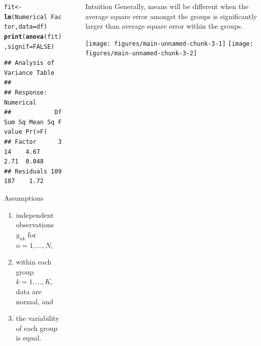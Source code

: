 \documentclass[final,9pt,fleqn]{beamer}\usepackage[]{graphicx}\usepackage[]{color}
\makeatletter
\newcommand{\hlnum}[1]{\textcolor[rgb]{0.686,0.059,0.569}{#1}}%
\newcommand{\hlopt}[1]{\textcolor[rgb]{0,0,0}{#1}}%
\newcommand{\hlstd}[1]{\textcolor[rgb]{0.345,0.345,0.345}{#1}}%
\newcommand{\hlkwb}[1]{\textcolor[rgb]{0.69,0.353,0.396}{#1}}%
\newcommand{\hlkwc}[1]{\textcolor[rgb]{0.333,0.667,0.333}{#1}}%
\newcommand{\hlkwd}[1]{\textcolor[rgb]{0.737,0.353,0.396}{\textbf{#1}}}%
\newenvironment{kframe}{%
 \def\at@end@of@kframe{}%
 \ifinner\ifhmode%
  \def\at@end@of@kframe{\end{minipage}}%
  \begin{minipage}{\columnwidth}%
 \fi\fi%
 \def\FrameCommand##1{\hskip\@totalleftmargin \hskip-\fboxsep
 \colorbox{shadecolor}{##1}\hskip-\fboxsep
     \hskip-\linewidth \hskip-\@totalleftmargin \hskip\columnwidth}%
 \MakeFramed {\advance\hsize-\width
   \@totalleftmargin\z@ \linewidth\hsize
   \@setminipage}}%
 {\par\unskip\endMakeFramed%
 \at@end@of@kframe}
\newenvironment{knitrout}{}{} %
\makeatother
\begin{document}
\begin{frame}[fragile]
\begin{columns}
\begin{column}{0.3\paperwidth}
\vspace{-0.1in}
\begin{knitrout}\large
{}\color{fgcolor}\begin{kframe}
\begin{alltt}
\hlstd{fit} \hlkwb{<-} \hlkwd{lm}\hlstd{(Numerical} \hlopt{~} \hlstd{Factor,} \hlkwc{data}\hlstd{=df)}
\hlkwd{print}\hlstd{(}\hlkwd{anova}\hlstd{(fit),} \hlkwc{signif}\hlstd{=}\hlnum{FALSE}\hlstd{)}
\end{alltt}
\begin{verbatim}
## Analysis of Variance Table
## 
## Response: Numerical
##            Df Sum Sq Mean Sq F value Pr(>F)
## Factor      3     14    4.67    2.71  0.048
## Residuals 109    187    1.72
\end{verbatim}
\end{kframe}
\end{knitrout}
\vspace{-0.1in}

  \begin{block}{{\huge Assumptions}}

  \begin{enumerate}
  \item independent observations $y_{nk}$ for $n=1, \ldots, N$,
  \item within each group $k=1, \ldots, K$, data are normal, and
  \item the variability of each group is equal.
  \end{enumerate}

  \end{block}
\end{column}

\begin{column}{.03\paperwidth}
\end{column}

\begin{column}{0.3\paperwidth}

  \begin{block}{{\huge Intuition}}
    Generally, means will be different when the average square error amongst the groups is significantly larger than average square error within the groups.
  \end{block}


\begin{knitrout}
\color{fgcolor}
\texttt{[image: figures/main-unnamed-chunk-3-1]} 
\texttt{[image: figures/main-unnamed-chunk-3-2]} 


\end{knitrout}
\end{column}
\end{columns}
\end{frame}
\end{document}

